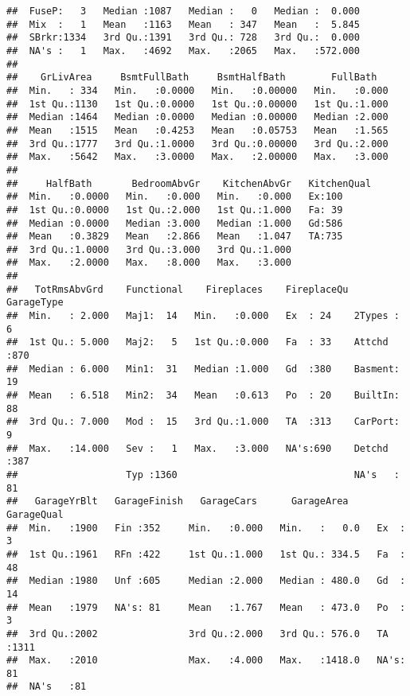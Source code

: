\documentclass[]{article}
\begin{document}
\begin{verbatim}
##  FuseP:   3   Median :1087   Median :   0   Median :  0.000  
##  Mix  :   1   Mean   :1163   Mean   : 347   Mean   :  5.845  
##  SBrkr:1334   3rd Qu.:1391   3rd Qu.: 728   3rd Qu.:  0.000  
##  NA's :   1   Max.   :4692   Max.   :2065   Max.   :572.000  
##                                                              
##    GrLivArea     BsmtFullBath     BsmtHalfBath        FullBath    
##  Min.   : 334   Min.   :0.0000   Min.   :0.00000   Min.   :0.000  
##  1st Qu.:1130   1st Qu.:0.0000   1st Qu.:0.00000   1st Qu.:1.000  
##  Median :1464   Median :0.0000   Median :0.00000   Median :2.000  
##  Mean   :1515   Mean   :0.4253   Mean   :0.05753   Mean   :1.565  
##  3rd Qu.:1777   3rd Qu.:1.0000   3rd Qu.:0.00000   3rd Qu.:2.000  
##  Max.   :5642   Max.   :3.0000   Max.   :2.00000   Max.   :3.000  
##                                                                   
##     HalfBath       BedroomAbvGr    KitchenAbvGr   KitchenQual
##  Min.   :0.0000   Min.   :0.000   Min.   :0.000   Ex:100     
##  1st Qu.:0.0000   1st Qu.:2.000   1st Qu.:1.000   Fa: 39     
##  Median :0.0000   Median :3.000   Median :1.000   Gd:586     
##  Mean   :0.3829   Mean   :2.866   Mean   :1.047   TA:735     
##  3rd Qu.:1.0000   3rd Qu.:3.000   3rd Qu.:1.000              
##  Max.   :2.0000   Max.   :8.000   Max.   :3.000              
##                                                              
##   TotRmsAbvGrd    Functional    Fireplaces    FireplaceQu   GarageType 
##  Min.   : 2.000   Maj1:  14   Min.   :0.000   Ex  : 24    2Types :  6  
##  1st Qu.: 5.000   Maj2:   5   1st Qu.:0.000   Fa  : 33    Attchd :870  
##  Median : 6.000   Min1:  31   Median :1.000   Gd  :380    Basment: 19  
##  Mean   : 6.518   Min2:  34   Mean   :0.613   Po  : 20    BuiltIn: 88  
##  3rd Qu.: 7.000   Mod :  15   3rd Qu.:1.000   TA  :313    CarPort:  9  
##  Max.   :14.000   Sev :   1   Max.   :3.000   NA's:690    Detchd :387  
##                   Typ :1360                               NA's   : 81  
##   GarageYrBlt   GarageFinish   GarageCars      GarageArea     GarageQual 
##  Min.   :1900   Fin :352     Min.   :0.000   Min.   :   0.0   Ex  :   3  
##  1st Qu.:1961   RFn :422     1st Qu.:1.000   1st Qu.: 334.5   Fa  :  48  
##  Median :1980   Unf :605     Median :2.000   Median : 480.0   Gd  :  14  
##  Mean   :1979   NA's: 81     Mean   :1.767   Mean   : 473.0   Po  :   3  
##  3rd Qu.:2002                3rd Qu.:2.000   3rd Qu.: 576.0   TA  :1311  
##  Max.   :2010                Max.   :4.000   Max.   :1418.0   NA's:  81  
##  NA's   :81                                                              

\end{verbatim}
\end{document}
